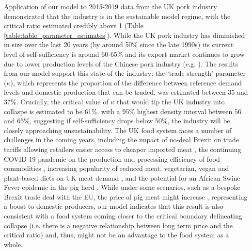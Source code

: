 \documentclass[9pt,twocolumn,twoside,lineno]{pnas-new}
\begin{document}
Application of our model to 2015-2019 data from the UK pork industry demonstrated that the industry is in the sustainable model regime, with the critical ratio estimated credibly above 1 (Table \ref{table:table_parameter_estimates}). While the UK pork industry has diminished in size over the last 20 years (by around 50\% since the late 1990s) its current level of self-sufficiency is around 60-65\% and its export market continues to grow due to lower production levels of the Chinese pork industry (e.g. \cite{AHDBexports2020}). The results from our model support this state of the industry: the `trade strength' parameter ($\kappa$), which represents the proportion of the difference between reference demand levels and domestic production that can be traded, was estimated between 35 and 37\%. Crucially, the critical value of $\kappa$ that would tip the UK industry into collaspe is estimated to be 61\%, with a 95\% highest density interval between 56 and 65\%, suggesting if self-sufficiency drops below 50\%, the industry will be closely approaching unsustainability. The UK food system faces a number of challenges in the coming years, including the impact of no-deal Brexit on trade tariffs allowing retailers easier access to cheaper imported meat \cite{feng2017}, the continuing COVID-19 pandemic on the production and processing efficiency of food commodities \cite{power2020}, increasing popularity of reduced meat, vegetarian, vegan and plant-based diets on UK meat demand \cite{james2020}, and the potential for an African Swine Fever epidemic in the pig herd \cite{normile2019,mason2020}. While under some scenarios, such as a bespoke Brexit trade deal with the EU, the price of pig meat might increase \cite{feng2017}, representing a boost to domestic producers, our model indicates that this result is also consistent with a food system coming closer to the critical boundary delineating collapse (i.e. there is a negative relationship between long term price and the critical ratio) and, thus, might not be an advantage to the food system as a whole.
\end{document}

